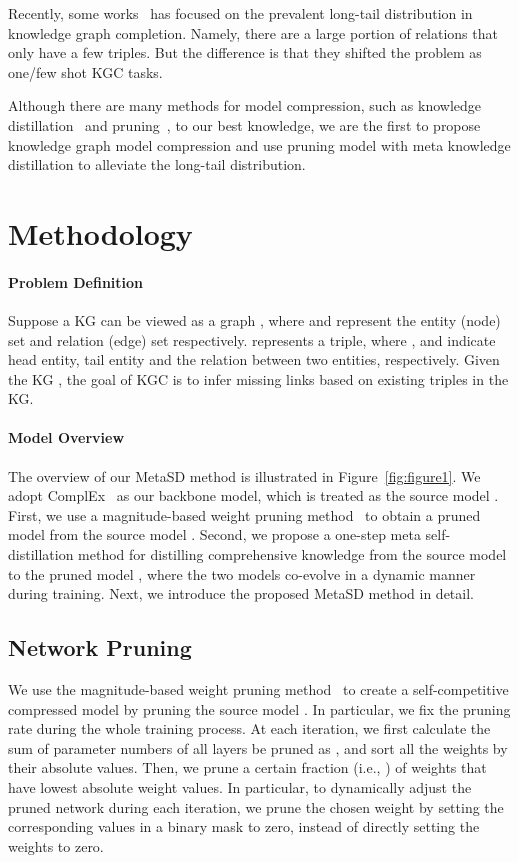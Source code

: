 \documentclass[11pt]{article}
\begin{document}
Recently, some works~\citep{xiong2018one,sheng2020adaptive} has focused on the prevalent long-tail distribution in knowledge graph completion. Namely, there are a large portion of relations that only have a few triples. But the difference is that they shifted the problem as one/few shot KGC tasks. 

Although there are many methods for model compression, such as knowledge distillation~\citep{hinton2015distilling} and pruning~\citep{han2015deep}, to our best knowledge, we are the first to propose knowledge graph model compression and use pruning model with meta knowledge distillation to alleviate the long-tail distribution. 
\fi

\section{Methodology}
\paragraph{Problem Definition}
Suppose a KG can be viewed as a graph , where  and  represent the entity (node) set and relation (edge) set respectively.  represents a triple, where ,  and  indicate head entity, tail entity and the relation between two entities, respectively. Given the KG , the goal of KGC is to infer missing links
based on existing triples in the KG.

\paragraph{Model Overview}
The overview of our MetaSD method is illustrated in Figure~\ref{fig:figure1}. 
We adopt ComplEx~\citep{trouillon2016complex} as our backbone model, which is treated as the source model . First, we use a magnitude-based weight pruning method~\citep{han2015deep,zhu2017prune} to obtain a pruned model  from the source model . Second, we propose a one-step meta self-distillation method for distilling comprehensive knowledge from the source model  to the pruned model , where the two models co-evolve in a dynamic manner during training. Next, we introduce the proposed MetaSD method in detail. 

\subsection{Network Pruning}
We use the magnitude-based weight pruning method~\citep{han2015deep,zhu2017prune} to create a self-competitive compressed model  by pruning the source model . In particular, 
we fix the pruning rate  during the whole training process. At each iteration, we first calculate the sum of parameter numbers of all layers be pruned as , and sort all the weights by their absolute values. Then, we prune a certain fraction (i.e., ) of weights that have lowest absolute weight values. In particular, to dynamically adjust the pruned network  during each iteration, we prune the chosen weight by setting the corresponding values in a binary mask to zero, instead of directly setting the weights to zero. 
\end{document}
